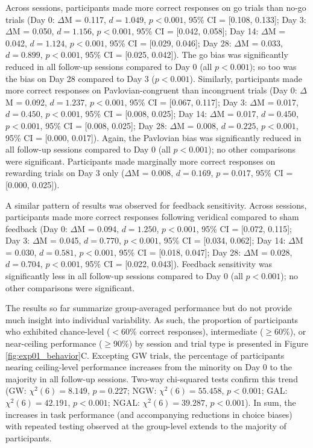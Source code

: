 \documentclass[a4paper,12pt]{article}
\begin{document}
\begin{refsection}[main]
Across sessions, participants made more correct responses on go trials than no-go trials (Day 0: $\Delta$M = 0.117, $d = 1.049$, $p < 0.001$, 95\% CI = [0.108, 0.133]; Day 3: $\Delta$M = 0.050, $d = 1.156$, $p < 0.001$, 95\% CI = [0.042, 0.058]; Day 14: $\Delta$M = 0.042, $d = 1.124$, $p < 0.001$, 95\% CI = [0.029, 0.046]; Day 28: $\Delta$M = 0.033, $d = 0.899$, $p < 0.001$, 95\% CI = [0.025, 0.042]). The go bias was significantly reduced in all follow-up sessions compared to Day 0 (all $p < 0.001$); so too was the bias on Day 28 compared to Day 3 ($p < 0.001$). Similarly, participants made more correct responses on Pavlovian-congruent than incongruent trials (Day 0: $\Delta$M = 0.092, $d = 1.237$, $p < 0.001$, 95\% CI = [0.067, 0.117]; Day 3: $\Delta$M = 0.017, $d = 0.450$, $p < 0.001$, 95\% CI = [0.008, 0.025]; Day 14: $\Delta$M = 0.017, $d = 0.450$, $p < 0.001$, 95\% CI = [0.008, 0.025]; Day 28: $\Delta$M = 0.008, $d = 0.225$, $p < 0.001$, 95\% CI = [0.000, 0.017]). Again, the Pavlovian bias was significantly reduced in all follow-up sessions compared to Day 0 (all $p < 0.001$); no other comparisons were significant. Participants made marginally more correct responses on rewarding trials on Day 3 only ($\Delta$M = 0.008, $d=0.169$, $p = 0.017$, 95\% CI = [0.000, 0.025]).

A similar pattern of results was observed for feedback sensitivity. Across sessions, participants made more correct responses following veridical compared to sham feedback (Day 0: $\Delta$M = 0.094, $d = 1.250$, $p < 0.001$, 95\% CI = [0.072, 0.115]; Day 3: $\Delta$M = 0.045, $d = 0.770$, $p < 0.001$, 95\% CI = [0.034, 0.062]; Day 14: $\Delta$M = 0.030, $d = 0.581$, $p < 0.001$, 95\% CI = [0.018, 0.047]; Day 28: $\Delta$M = 0.028, $d = 0.704$, $p < 0.001$, 95\% CI = [0.022, 0.043]). Feedback sensitivity was significantly less in all follow-up sessions compared to Day 0 (all $p < 0.001$); no other comparisons were significant.

The results so far summarize group-averaged performance but do not provide much insight into individual variability. As such, the proportion of participants who exhibited chance-level ($<$60\% correct responses), intermediate ($\geq$60\%), or near-ceiling performance ($\geq$90\%) by session and trial type is presented in Figure \ref{fig:exp01_behavior}C. Excepting GW trials, the percentage of participants nearing ceiling-level performance increases from the minority on Day 0 to the majority in all follow-up sessions. Two-way chi-squared tests confirm this trend (GW: $\chi^2 (6) = 8.149$, $p = 0.227$; NGW: $\chi^2 (6) = 55.458$, $p < 0.001$; GAL: $\chi^2 (6) = 42.191$, $p < 0.001$; NGAL: $\chi^2 (6) = 39.287$, $p < 0.001$). In sum, the increases in task performance (and accompanying reductions in choice biases) with repeated testing observed at the group-level extends to the majority of participants. 


\end{refsection}
\end{document}
